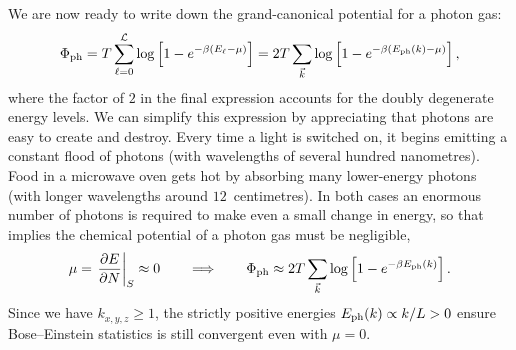 We are now ready to write down the grand-canonical potential for a photon gas:
\begin{equation*}
  \Phi_{\text{ph}} = T \sum_{\ell = 0}^{\mathcal L} \log\left[1 - e^{-\beta (E_{\ell} - \mu)}\right] = 2T \sum_{\vec k} \log\left[1 - e^{-\beta (E_{\text{ph}}(k) - \mu)}\right],
\end{equation*}
where the factor of $2$ in the final expression accounts for the doubly degenerate energy levels.
We can simplify this expression by appreciating that photons are easy to create and destroy.
Every time a light is switched on, it begins emitting a constant flood of photons (with wavelengths of several hundred nanometres).
Food in a microwave oven gets hot by absorbing many lower-energy photons (with longer wavelengths around $12$~centimetres).
In both cases an enormous number of photons is required to make even a small change in energy, so that  implies the chemical potential of a photon gas must be negligible,
\begin{equation*}
  \mu = \left.\frac{\partial E}{\partial N}\right|_S \approx 0 \qquad \Longrightarrow \qquad \Phi_{\text{ph}} \approx 2T \sum_{\vec k} \log\left[1 - e^{-\beta E_{\text{ph}}(k)}\right].
\end{equation*}
Since we have $k_{x, y, z} \geq 1$, the strictly positive energies $E_{\text{ph}}(k) \propto k / L > 0$ ensure Bose--Einstein statistics is still convergent even with $\mu = 0$.

